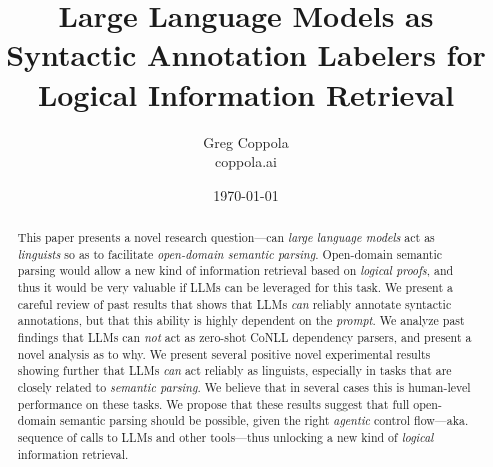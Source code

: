 \documentclass[11pt]{article}
\title{Large Language Models as Syntactic Annotation Labelers for Logical Information Retrieval}
\author{Greg Coppola\\coppola.ai}
\date{\today}
\begin{document}
\maketitle

\begin{abstract}
    This paper presents a novel research question---can {\em large language models} act as {\em linguists} so as to facilitate {\em open-domain semantic parsing}.
    Open-domain semantic parsing would allow a new kind of information retrieval based on {\em logical proofs}, and thus it would be very valuable if LLMs can be leveraged for this task.
    We present a careful review of past results that shows that LLMs {\em can} reliably annotate syntactic annotations, but that this ability is highly dependent on the {\em prompt}.
    We analyze past findings that LLMs can {\em not} act as zero-shot CoNLL dependency parsers, and present a novel analysis as to why.
    We present several positive novel experimental results showing further that LLMs {\em can} act reliably as linguists, especially in tasks that are closely related to {\em semantic parsing}.
    We believe that in several cases this is human-level performance on these tasks.
    We propose that these results suggest that full open-domain semantic parsing should be possible, given the right {\em agentic} control flow---aka. sequence of calls to LLMs and other tools---thus unlocking a new kind of {\em logical} information retrieval.
\end{abstract}
\end{document}

